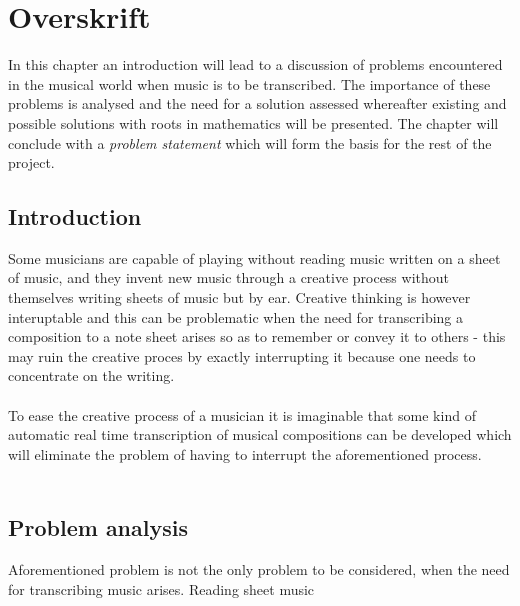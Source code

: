 \chapter{Overskrift} \label{ch1}
In this chapter an introduction will lead to a discussion of problems encountered in the musical world when music is to be transcribed. The importance of these problems is analysed and the need for a solution assessed whereafter existing and possible solutions with roots in mathematics will be presented. The chapter will conclude with a \textit{problem statement} which will form the basis for the rest of the project.
\section{Introduction}
Some musicians are capable of playing without reading music written on a sheet of music, and they invent new music through a creative process without themselves writing sheets of music but by ear. Creative thinking is however interuptable and this can be problematic when the need for transcribing a composition to a note sheet arises so as to remember or convey it to others - this may ruin the creative proces by exactly interrupting it because one needs to concentrate on the writing.\\\\
To ease the creative process of a musician it is imaginable that some kind of automatic real time transcription of musical compositions can be developed which will eliminate the problem of having to interrupt the aforementioned process.\\\\
\section{Problem analysis}
Aforementioned problem is not the only problem to be considered, when the need for transcribing music arises. Reading sheet music
%
